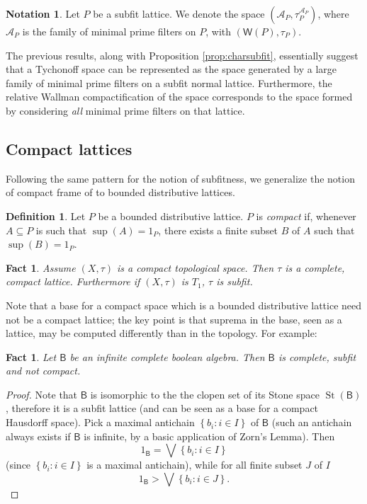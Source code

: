 \documentclass{article}
\newcommand{\aaa}{\mathcal{A} }
\newcommand{\corn}[1]{(\mathsf{W}(#1),\tau_{#1})}
\theoremstyle{plain}
\newtheorem{fact}[theorem]{Fact}
\theoremstyle{definition}
\newtheorem{definition}[theorem]{Definition}
\newtheorem{notation}[theorem]{Notation}
\theoremstyle{remark}
\DeclareMathOperator{\St}{St}
\newcommand{\bool}[1]{\mathsf{#1}}
\newcommand{\bp}[1]{\left\lbrace #1 \right\rbrace}
\newcommand{\0}{\mathbbm 0}
\newcommand{\1}{\mathbbm 1}
\newcommand{\2}{\mathbbm 2}
\begin{document}
\begin{notation}\label{not:WP}
    Let $P$ be a subfit lattice. We denote the space $(\aaa_P, \tau^{\aaa_P}_P)$, where $\aaa_P$ is the family of minimal prime filters on $P$, with $\corn{P}$.

\end{notation}



The previous results, along with Proposition \ref{prop:charsubfit}, essentially suggest that a Tychonoff space can be represented as the space generated by a large family of minimal prime filters on a subfit normal lattice. Furthermore, the relative Wallman compactification  of the space corresponds to the space formed by considering \emph{all} minimal prime filters on that lattice.

\subsection{Compact lattices}
\label{subsec:compactlattices}


Following the same pattern for the notion of subfitness, we generalize the notion of compact frame of \cite{picado2011frames} to  bounded distributive lattices.


\begin{definition}
\label{def:compactlattices} 
Let $P$ be a bounded distributive lattice.
$P$ is \emph{compact} if,  
whenever $A\subseteq P$ is such that $\sup(A)=1_P$, there exists a finite subset $B$ of $A$ such that $\sup(B)=1_P$.
 \end{definition}

\begin{fact}
\label{fact:completecomplact}
Assume $(X,\tau)$ is a compact topological space. 
Then $\tau$ is a complete, compact  lattice. Furthermore if $(X,\tau)$ is $T_1$, $\tau$ is subfit.
\end{fact}

Note that a base for a compact space which is a bounded distributive lattice need not be a compact lattice; the key point is that suprema in the base, seen as a lattice, may be computed differently than in the topology. For example:

\begin{fact}
\label{fact:completenotcompact}
Let $\bool{B}$ be an infinite complete boolean algebra. Then $\bool{B}$ is complete, subfit and not compact.

\end{fact}
\begin{proof}
Note that $\bool{B}$ is isomorphic to the the clopen set of its Stone space $\St(\bool{B})$, therefore it is a subfit lattice (and can be seen as a base for a compact Hausdorff space).
Pick a maximal antichain $\bp{b_i:i\in I}$ of $\bool{B}$ (such an antichain always exists if $\bool{B}$ is infinite, by a basic application of Zorn's Lemma).
Then 
\[
1_\bool{B}=\bigvee\bp{b_i:i\in I}
\] 
(since $\bp{b_i:i\in I}$  is a maximal antichain),
while for all finite subset $J$ of $I$ 
\[
1_\bool{B}>\bigvee \bp{b_i:i\in J}.
\]
\end{proof}
\end{document}
